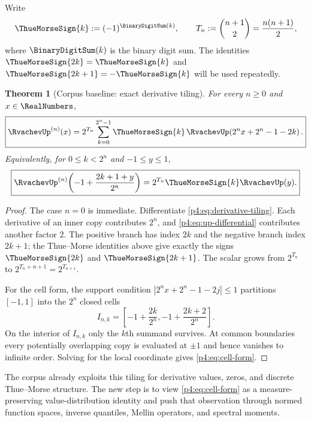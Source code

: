 \documentclass[11pt,oneside]{article}
\newtheorem{theorem}{Theorem}[section]
\theoremstyle{definition}
\theoremstyle{remark}
\begin{document}
Write
\begin{equation}
 \ThueMorseSign{k}:=(-1)^{\BinaryDigitSum(k)},\qquad
 T_n:=\binom{n+1}{2}=\frac{n(n+1)}2,
 \label{p4:eq:epsilon-Tn}
\end{equation}
where $\BinaryDigitSum(k)$ is the binary digit sum.  The identities
$\ThueMorseSign{2k}=\ThueMorseSign{k}$ and
$\ThueMorseSign{2k+1}=-\ThueMorseSign{k}$ will be used repeatedly.

\begin{theorem}[Corpus baseline: exact derivative tiling]
\label{p4:thm:derivative-tiling}
For every $n\geq0$ and $x\in\RealNumbers$,
\begin{equation}
 \boxed{
 \RvachevUp^{(n)}(x)=2^{T_n}
 \sum_{k=0}^{2^n-1}\ThueMorseSign{k}\,
 \RvachevUp\!\left(2^n x+2^n-1-2k\right).}
 \label{p4:eq:derivative-tiling}
\end{equation}
Equivalently, for $0\leq k<2^n$ and $-1\leq y\leq1$,
\begin{equation}
 \boxed{
 \RvachevUp^{(n)}\!\left(-1+\frac{2k+1+y}{2^n}\right)
 =2^{T_n}\ThueMorseSign{k}\RvachevUp(y).}
 \label{p4:eq:cell-form}
\end{equation}
\end{theorem}

\begin{proof}
The case $n=0$ is immediate.  Differentiate \eqref{p4:eq:derivative-tiling}.  Each derivative
of an inner copy contributes $2^n$, and \eqref{p4:eq:up-differential} contributes another
factor $2$.  The positive branch has index $2k$ and the negative branch index $2k+1$;
the Thue--Morse identities above give exactly the signs $\ThueMorseSign{2k}$ and
$\ThueMorseSign{2k+1}$.  The scalar grows from $2^{T_n}$ to
$2^{T_n+n+1}=2^{T_{n+1}}$.

For the cell form, the support condition
$|2^nx+2^n-1-2j|\leq1$ partitions $[-1,1]$ into the $2^n$ closed cells
\[
 I_{n,k}=\left[-1+\frac{2k}{2^n},-1+\frac{2k+2}{2^n}\right].
\]
On the interior of $I_{n,k}$ only the $k$th summand survives.  At common boundaries every
potentially overlapping copy is evaluated at $\pm1$ and hence vanishes to infinite order.
Solving for the local coordinate gives \eqref{p4:eq:cell-form}.
\end{proof}

\begin{remark}
The corpus already exploits this tiling for derivative values, zeros, and discrete
Thue--Morse structure.  The new step is to view \eqref{p4:eq:cell-form} as a
measure-preserving value-distribution identity and push that observation through normed
function spaces, inverse quantiles, Mellin operators, and spectral moments.
\end{remark}
\end{document}

